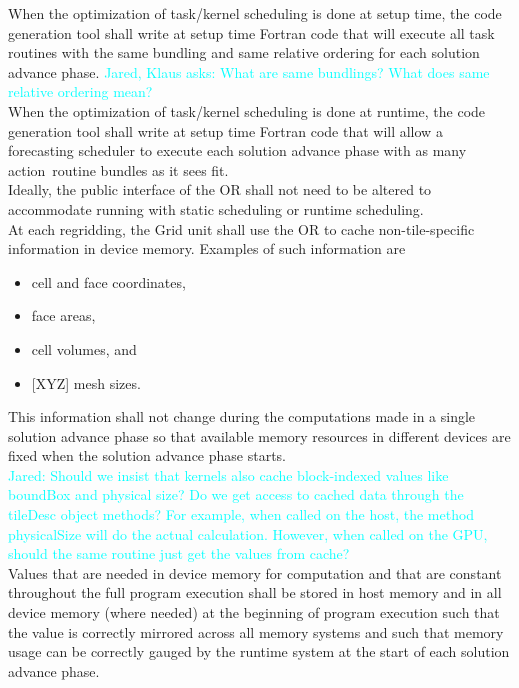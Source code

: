 \documentclass{article}
\newcommand{\Jared}[1]          {\textcolor{cyan}{Jared: #1}}
\newcommand{\JaredQfromKW}[1]   {\textcolor{cyan}{Jared, Klaus asks: #1}}
\newcommand{\shortOR}   {OR\xspace}
\newcommand{\OR}        {\shortOR}
\newcommand{\qsaa}                   {action\ }                 %
\newcommand{\actionroutinebundles} {\qsaa routine bundles\xspace} %
\newcommand{\taskroutines}       {task routines\xspace}
\begin{document}
When the optimization of task/kernel scheduling is done at setup time, the
code generation tool shall write at setup time Fortran code that will execute
all \taskroutines with the same bundling and same relative ordering for each
solution advance phase.
\JaredQfromKW{What are same bundlings? What does same relative ordering mean?}\\

When the optimization of task/kernel scheduling is done at runtime, the
code generation tool shall write at setup time Fortran code that will allow a
forecasting scheduler to execute each solution advance phase with as many \actionroutinebundles as it
sees fit.\\

Ideally, the public interface of the \OR shall not need to be
altered to accommodate running with static scheduling or runtime scheduling.\\

At each regridding, the Grid unit shall use the \OR to cache
non-tile-specific information in device memory.  Examples of such information
are
\begin{itemize}
\item{cell and face coordinates,}
\item{face areas, }
\item{cell volumes, and}
\item{[XYZ] mesh sizes.}
\end{itemize}
This information shall not change during the computations made in a single solution
advance phase so that available memory resources in different devices are fixed when the
solution advance phase starts.\\

\Jared{Should we insist that kernels also cache block-indexed values
like boundBox and physical size?  Do we get access to cached data through the
tileDesc object methods?  For example, when called on the host, the method
physicalSize will do the actual calculation.  However, when called on the GPU,
should the same routine just get the values from cache?}\\

Values that are needed in device memory for computation and that are constant
throughout the full program execution shall be stored in host memory and in all
device memory (where needed) at the beginning of program execution such that the
value is correctly mirrored across all memory systems and such that memory
usage can be correctly gauged by the runtime system at the start of each
solution advance phase.\\
\end{document}
